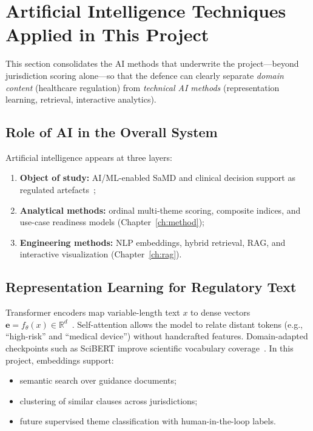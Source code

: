 \section{Artificial Intelligence Techniques Applied in This Project}
\label{sec:ai}

This section consolidates the AI methods that underwrite the project---beyond
jurisdiction scoring alone---so that the defence can clearly separate
\emph{domain content} (healthcare regulation) from \emph{technical AI methods}
(representation learning, retrieval, interactive analytics).

\subsection{Role of AI in the Overall System}
\label{sec:ai-role}

Artificial intelligence appears at three layers:
\begin{enumerate}[noitemsep]
  \item \textbf{Object of study:} AI/ML-enabled SaMD and clinical decision support as
        regulated artefacts~\cite{topol2019,rajpurkar2022,esteva2019};
  \item \textbf{Analytical methods:} ordinal multi-theme scoring, composite indices, and
        use-case readiness models (Chapter~\ref{ch:method});
  \item \textbf{Engineering methods:} NLP embeddings, hybrid retrieval, RAG, and
        interactive visualization (Chapter~\ref{ch:rag}).
\end{enumerate}

\subsection{Representation Learning for Regulatory Text}
\label{sec:ai-rep}

Transformer encoders map variable-length text $x$ to dense vectors
$\mathbf{e}=f_\theta(x)\in\mathbb{R}^{d}$~\cite{vaswani2017,devlin2019}. Self-attention
allows the model to relate distant tokens (e.g., ``high-risk'' and ``medical device'')
without handcrafted features. Domain-adapted checkpoints such as SciBERT improve
scientific vocabulary coverage~\cite{beltagy2019}. In this project, embeddings support:
\begin{itemize}[noitemsep]
  \item semantic search over guidance documents;
  \item clustering of similar clauses across jurisdictions;
  \item future supervised theme classification with human-in-the-loop labels.
\end{itemize}

